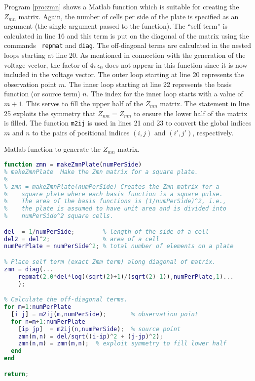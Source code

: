Program \ref{pro:zmn} shows a Matlab function which is suitable for
creating the $Z_{mn}$ matrix.  Again, the number of cells per side of
the plate is specified as an argument (the single argument passed to
the function).  The ``self term'' is calculated in line 16 and this
term is put on the diagonal of the matrix using the commands {\tt
repmat} and {\tt diag}.  The off-diagonal terms are calculated in the
nested loops starting at line 20.  As mentioned in connection with the
generation of the voltage vector, the factor of $4\pi\epsilon_0$ does
not appear in this function since it is now included in the voltage
vector.  The outer loop starting at line 20 represents the observation
point $m$.  The inner loop starting at line 22 represents the basis
function (or source term) $n$.  The index for the inner loop starts
with a value of $m+1$.  This serves to fill the upper half of the
$Z_{mn}$ matrix.  The statement in line 25 exploits the symmetry that
$Z_{nm}=Z_{mn}$ to ensure the lower half of the matrix is filled.  The
function {\tt m2ij} is used in lines 21 and 23 to convert the global
indices $m$ and $n$ to the pairs of positional indices $(i,j)$ and
$(i',j')$, respectively.
\begin{program}
Matlab function to generate the $Z_{mn}$ matrix. \label{pro:zmn}
\codemiddle
\begin{lstlisting}[language=Matlab]
function zmn = makeZmnPlate(numPerSide)
% makeZmnPlate  Make the Zmn matrix for a square plate.
%
% zmn = makeZmnPlate(numPerSide) Creates the Zmn matrix for a
%    square plate where each basis function is a square pulse.
%    The area of the basis functions is (1/numPerSide)^2, i.e.,
%    the plate is assumed to have unit area and is divided into
%    numPerSide^2 square cells.

del  = 1/numPerSide;        % length of the side of a cell
del2 = del^2;               % area of a cell
numPerPlate = numPerSide^2; % total number of elements on a plate

% Place self term (exact Zmm term) along diagonal of matrix.
zmn = diag(...
    repmat(2.0*del*log((sqrt(2)+1)/(sqrt(2)-1)),numPerPlate,1)...
    );

% Calculate the off-diagonal terms.
for m=1:numPerPlate
  [i j] = m2ij(m,numPerSide);       % observation point
  for n=m+1:numPerPlate
    [ip jp]  = m2ij(n,numPerSide);  % source point
    zmn(m,n) = del/sqrt((i-ip)^2 + (j-jp)^2);
    zmn(n,m) = zmn(m,n);  % exploit symmetry to fill lower half
  end
end

return;
\end{lstlisting}
\end{program}

